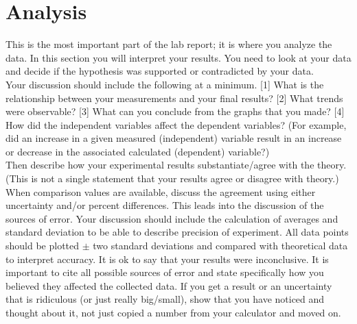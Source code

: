 \documentclass[12pt]{article}
\begin{document}









\section{Analysis}
	This is the most important part of the lab report; it is where you
analyze the data. In this section you will interpret your results. You need to look at your data and decide if the hypothesis was supported or contradicted by your data.  \\ %
    
    Your discussion should include the following at a minimum. [1] What is the relationship between your measurements and your final results? [2] What trends were observable? [3] What can you conclude from the graphs that you made? [4] How did the independent variables affect the dependent variables? (For example, did an increase in a given measured (independent) variable result in an increase or decrease in the associated calculated (dependent) variable?) \\ 

Then describe how your experimental results substantiate/agree with the theory. (This is not a single statement that your results agree or disagree with theory.) When comparison values are available, discuss the agreement using either uncertainty and/or percent differences. This leads into the discussion of the sources of error. Your discussion should include the calculation of averages and standard deviation to be able to describe precision of experiment. All data points should be plotted $\pm$ two standard deviations and compared with theoretical data to interpret accuracy. It is ok to say that your results were inconclusive. It is important to cite all possible sources of error and state specifically how you believed they affected the collected data. If you get a result or an uncertainty that is ridiculous (or just really big/small), show that you have noticed and thought about it, not just copied a number from your calculator and moved on. \\
\end{document}
